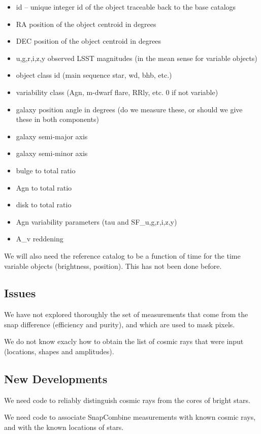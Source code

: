 \documentclass[12pt]{article}
\begin{document}
\begin{itemize}
\item id -- unique integer id of the object traceable back to the base catalogs
\item RA position of the object centroid in degrees
\item DEC position of the object centroid in degrees
\item {u,g,r,i,z,y} observed LSST magnitudes (in the mean sense for variable objects)
\item object class id (main sequence star, wd, bhb, etc.)
\item variability class (Agn, m-dwarf flare, RRly, etc. 0 if not variable)
\item galaxy position angle in degrees (do we measure these, or should we give these in both components)
\item galaxy semi-major axis 
\item galaxy semi-minor axis
\item bulge to total ratio
\item Agn to total ratio
\item disk to total ratio
\item Agn variability parameters (tau and SF\_{u,g,r,i,z,y})
\item A\_v reddening 
\end{itemize}

We will also need the reference catalog to be a function of time for
the time variable objects (brightness, position).  This has not been
done before.

\subsection{Issues}

We have not explored thoroughly the set of measurements that come from
the snap difference (efficiency and purity), and which are used to
mask pixels.

We do not know exacly how to obtain the list of cosmic rays that were
input (locations, shapes and amplitudes).

\subsection{New Developments}

We need code to reliably distinguish cosmic rays from the cores of
bright stars.

We need code to associate SnapCombine measurements with known cosmic
rays, and with the known locations of stars.
\end{document}
